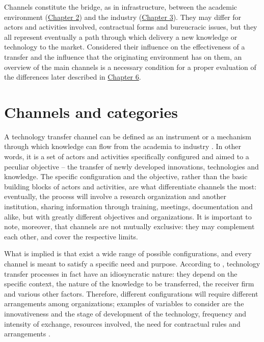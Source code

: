 

\label{Chapter4} %

Channels constitute the bridge, as in infrastructure, between the academic environment (\hyperref[Chapter2]{Chapter 2}) and the industry (\hyperref[Chapter3]{Chapter 3}). They may differ for actors and activities involved, contractual forms and bureucracic issues, but they all represent eventually a path through which delivery a new knowledge or technology to the market. Considered their influence on the effectiveness of a transfer and the influence that the originating environment has on them, an overview of the main channels is a necessary condition for a proper evaluation of the differences later described in \hyperref[Chapter6]{Chapter 6}.  

\section{Channels and categories}

A technology transfer channel can be defined as an instrument or a mechanism through which knowledge can flow from the academia to industry \citep{Gilsing2011}. In other words, it is a set of actors and activities specifically configured and aimed to a peculiar objective – the transfer of newly developed innovations, technologies and knowledge. The specific configuration and the objective, rather than the basic building blocks of actors and activities, are what differentiate channels the most: eventually, the process will involve a research organization and another institution, sharing information through training, meetings, documentation and alike, but with greatly different objectives and organizations. It is important to note, moreover, that channels are not mutually exclusive: they may complement each other, and cover the respective limits.

What is implied is that exist a wide range of possible configurations, and every channel is meant to satisfy a specific need and purpose. According to \citet{DEste2007}, technology transfer processes in fact have an idiosyncratic nature: they depend on the specific context, the nature of the knowledge to be transferred, the receiver firm and various other factors. Therefore, different configurations will require different arrangements among organizations; examples of variables to consider are the innovativeness and the stage of development of the technology, frequency and intensity of exchange, resources involved, the need for contractual rules and arrangements \citep{DEste2007}.

